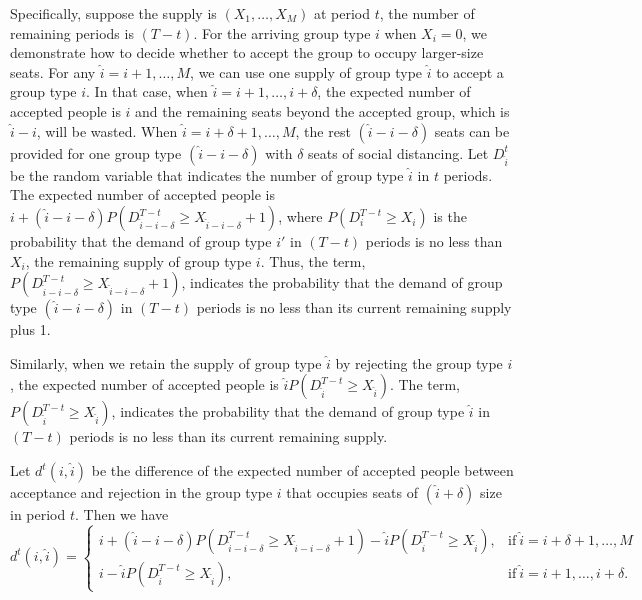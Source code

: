 Specifically, suppose the supply is $(X_1, \ldots, X_M)$ at period $t$, the number of remaining periods is $(T-t)$. For the arriving group type ${i}$ when $X_{i} = 0$, we demonstrate how to decide whether to accept the group to occupy larger-size seats. For any $\hat{i}={i}+1, \ldots, M$, we can use one supply of group type $\hat{i}$ to accept a group type ${i}$. In that case, when $\hat{i} = {i}+1, \ldots, i+\delta$, the expected number of accepted people is ${i}$ and the remaining seats beyond the accepted group, which is $\hat{i}-{i}$, will be wasted. When $\hat{i} = {i}+\delta+1, \ldots, M$, the rest $(\hat{i}-{i}-\delta)$ seats can be provided for one group type $(\hat{i}-{i}-\delta)$ with $\delta$ seats of social distancing. Let $D_{\hat{i}}^{t}$ be the random variable that indicates the number of group type $\hat{i}$ in $t$ periods. The expected number of accepted people is ${i} + (\hat{i}-{i}-\delta)P(D_{\hat{i}-{i}-\delta}^{T-t} \geq X_{\hat{i}-{i}-\delta}+1)$, where $P(D_{i}^{T-t} \geq X_{i})$ is the probability that the demand of group type ${i{'}}$ in $(T-t)$ periods is no less than $X_{i}$, the remaining supply of group type ${i}$. Thus, the term, $P(D_{\hat{i}-{i}-\delta}^{T-t} \geq X_{\hat{i}-{i}-\delta}+1)$, indicates the probability that the demand of group type $(\hat{i}-{i}-\delta)$ in $(T-t)$ periods is no less than its current remaining supply plus 1.

Similarly, when we retain the supply of group type $\hat{i}$ by rejecting the group type ${i}$, the expected number of accepted people is $\hat{i} P(D_{\hat{i}}^{T-t} \geq X_{\hat{i}})$. The term, $P(D_{\hat{i}}^{T-t} \geq X_{\hat{i}})$, indicates the probability that the demand of group type $\hat{i}$ in $(T-t)$ periods is no less than its current remaining supply.

Let $d^{t}({i},\hat{i})$ be the difference of the expected number of accepted people between acceptance and rejection in the group type ${i}$ that occupies seats of $(\hat{i}+\delta)$ size in period $t$. Then we have
\begin{equation*}
	d^{t}({i},\hat{i}) = \begin{cases}
    {i} + (\hat{i}-{i}-\delta)P(D_{\hat{i}-{i}-\delta}^{T-t} \geq X_{\hat{i}-{i}-\delta}+1) - \hat{i} P(D_{\hat{i}}^{T-t} \geq X_{\hat{i}}), &\text{if}~ \hat{i} = {i}+\delta+1, \ldots, M \\
    {i} - \hat{i} P(D_{\hat{i}}^{T-t} \geq X_{\hat{i}}), &\text{if}~ \hat{i} = {i}+1, \ldots, {i}+\delta.
		\end{cases}
\end{equation*}

